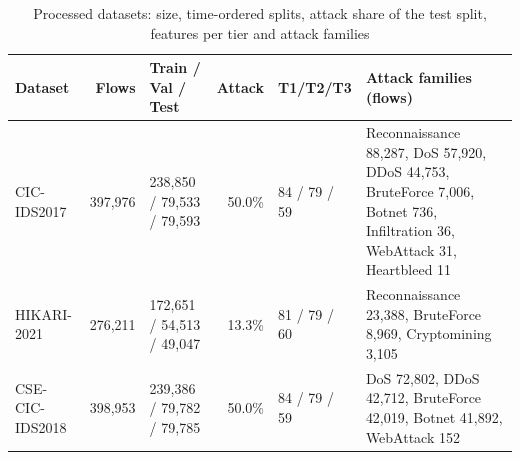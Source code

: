 \begin{table}[!htbp]
\centering
\caption{Processed datasets: size, time-ordered splits, attack share of the test split, features per tier and attack families}
\label{tab:data}
\footnotesize
\setlength{\tabcolsep}{3.5pt}
\begin{tabular}{>{\raggedright\arraybackslash}p{1.9cm}rlrl>{\raggedright\arraybackslash}p{5.3cm}}
\toprule
\textbf{Dataset} & \textbf{Flows} & \textbf{Train / Val / Test} & \textbf{Attack} & \textbf{T1/T2/T3} & \textbf{Attack families (flows)} \\
\midrule
CIC-IDS2017 & 397,976 & 238,850 / 79,533 / 79,593 & 50.0\% & 84 / 79 / 59 & Reconnaissance 88,287, DoS 57,920, DDoS 44,753, BruteForce 7,006, Botnet 736, Infiltration 36, WebAttack 31, Heartbleed 11 \\
HIKARI-2021 & 276,211 & 172,651 / 54,513 / 49,047 & 13.3\% & 81 / 79 / 60 & Reconnaissance 23,388, BruteForce 8,969, Cryptomining 3,105 \\
CSE-CIC-IDS2018 & 398,953 & 239,386 / 79,782 / 79,785 & 50.0\% & 84 / 79 / 59 & DoS 72,802, DDoS 42,712, BruteForce 42,019, Botnet 41,892, WebAttack 152 \\
\bottomrule
\end{tabular}
\end{table}
